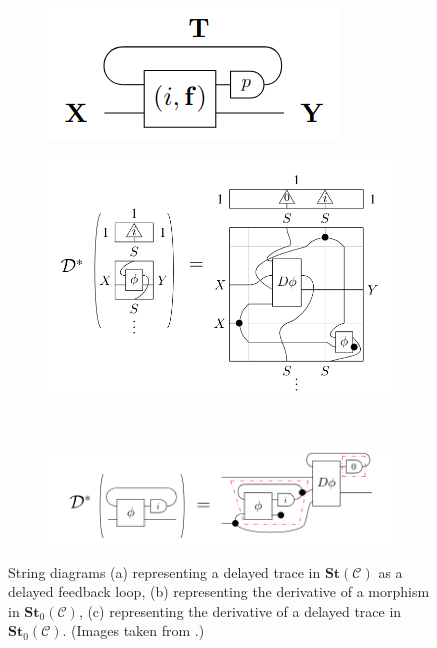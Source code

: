 \documentclass[11pt,a4paper,openright,twoside]{report}
\theoremstyle{plain}
\theoremstyle{definition}
\begin{document}
\begin{figure}[h]
  \begin{center}
    \begin{subfigure}{0.3\textwidth}
      \includegraphics[width=\textwidth]{figures/delayed_trace.png}
      \caption{}
    \end{subfigure}
    \begin{subfigure}{0.45\textwidth}
      \includegraphics[width=\textwidth]{figures/differentiation_of_stateful_morphism.png}
      \caption{}
    \end{subfigure}
    \\[1cm]
    \begin{subfigure}{0.5\textwidth}
      \includegraphics[width=\textwidth]{figures/differentiation_of_delayed_trace.png}
      \caption{}
    \end{subfigure}           
    \caption[Delayed trace and derivatives in $\mathbf{St}_0(\mathcal{C})$]{String diagrams (a) representing a delayed trace in $\mathbf{St}(\mathcal{C})$ as a delayed feedback loop, (b) representing the derivative of a morphism in $\mathbf{St}_0(\mathcal{C})$, (c) representing the derivative of a delayed trace in $\mathbf{St}_0(\mathcal{C})$. (Images taken from \cite{sprunger2019differentiable}.)}
    \label{fig: differentiationanddelayedtrace}
  \end{center}
\end{figure}
\end{document}
